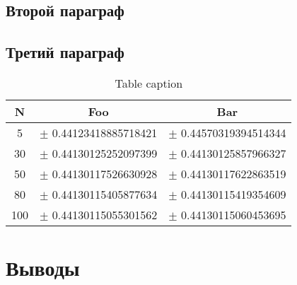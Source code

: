\documentclass[a4paper]{report}
\renewcommand{\small}{\fontsize{12}{12}\selectfont}
\begin{document}
	\section{Второй параграф}	
	\lipsum[58-63]
	\section{Третий параграф}
	\begin{table}[h!]
		\small
		\centering
		\begin{tabular}{|c|c|c|}
			\hline
			N & Foo & Bar
			\\ \hline
			5   & $\pm$ 0.44123418885718421 & $\pm$ 0.44570319394514344 \\ \hline
			30  & $\pm$ 0.44130125252097399 & $\pm$ 0.44130125857966327 \\ \hline
			50  & $\pm$ 0.44130117526630928 & $\pm$ 0.44130117622863519 \\ \hline
			80  & $\pm$ 0.44130115405877634 & $\pm$ 0.44130115419354609 \\ \hline
			100 & $\pm$ 0.44130115055301562 & $\pm$ 0.44130115060453695 \\ \hline
		\end{tabular}
		\caption{Table caption}
		\label{table:combined_3p-vx-vy-coeff}
	\end{table}
	\lipsum[63-68]
		
	\chapter*{Выводы}
	\lipsum[69-73]
		
\end{document}
